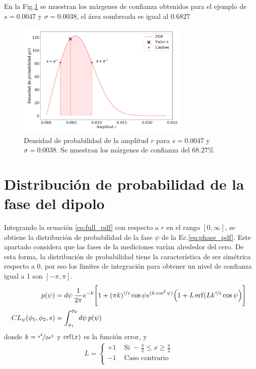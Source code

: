 En la Fig.\ref{margenes} se muestran los márgenes de confianza obtenidos para el ejemplo de $s=0.0047$ y $\sigma=0.0038$, el área sombreada es igual al $0.6827$
\begin{figure}[H]
    \begin{small}
        \begin{center}
            \includegraphics[width=0.75\textwidth]{bessel_prob_ej_v2.pdf}
        \end{center}
        \caption{Densidad de probabilidad de la amplitud $r$ para $s=0.0047$ y $\sigma=0.0038$. Se muestran los márgenes de confianza del $68.27\%$ }
        \label{margenes}
    \end{small}
\end{figure}

\section{Distribución de probabilidad de la fase del dipolo}

Integrando la ecuación \ref{eq:full_pdf} con respecto a $r$ en el rango $[0,\infty]$, se obtiene la distribución de probabilidad de la fase $\psi$ de la Ec.\ref{eq:phase_pdf}. Este apartado considera que las fases de la mediciones varían alrededor del cero. De esta forma, la distribución de probabilidad tiene la característica  de ser simétrica respecto a 0, por eso los límites de integración para obtener un nivel de confianza igual a 1 son $[-\pi, \pi]$.
\begin{align}
    p(\psi) &=d\psi\,\frac{1}{2\pi}e^{-k} \Bigg[ 1 + (\pi k)^{\nicefrac{1}{2}} \cos\psi e^{(k\cos^2\psi)} \Big( 1 + L \erf(L k^{\nicefrac{1}{2}} \cos\psi \Big) \Bigg ] \\ \label{eq:phase_pdf}
    CL_{\psi}(\phi_1, \phi_2, s) &= \int_{\phi_1}^{\phi_2} d\psi \, p(\psi)
\end{align}  
donde $k =\nicefrac{s^2}{2\sigma^2}$ y $\erf (x)$ es la función error, y
\begin{align*}
    L =
    \begin{cases} 
        +1 & \text{ Si } -\frac{\pi}{2} \leq x\geq \frac{\pi}{2} \\
        -1 & \text{ Caso contrario }  \\
     \end{cases}
\end{align*}

